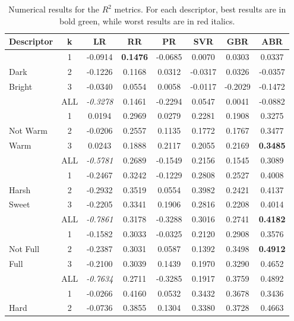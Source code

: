 \begin{table}[tbp] %
\caption{Numerical results for the $R^2$ metrics. For each descriptor, best results are in bold green, while worst results are in red italics.}
\label{tab:Violin:allR2}
\centering
\bgroup
\def\arraystretch{1.5}
\begin{tabular}{||l|c|c|c|c|c|c|c||}
\hline
\hline
Descriptor & k & LR & RR & PR & SVR & GBR & ABR\\
\hline
\hline
 & 1 & -0.0914 & \color[HTML]{326B00}\textbf{0.1476} & -0.0685 & 0.0070 & 0.0303 & 0.0337 \\
Dark & 2 & -0.1226 & 0.1168 & 0.0312 & -0.0317 & 0.0326 & -0.0357 \\
Bright & 3 & -0.0340 & 0.0554 & 0.0058 & -0.0117 & -0.2029 & -0.1472 \\
 & ALL & \color[HTML]{8E0000}\textit{-0.3278} & 0.1461 & -0.2294 & 0.0547 & 0.0041 & -0.0882 \\
\hline
\hline
 & 1 & 0.0194 & 0.2969 & 0.0279 & 0.2281 & 0.1908 & 0.3275 \\
Not Warm & 2 & -0.0206 & 0.2557 & 0.1135 & 0.1772 & 0.1767 & 0.3477 \\
Warm & 3 & 0.0243 & 0.1888 & 0.2117 & 0.2055 & 0.2169 & \color[HTML]{326B00}\textbf{0.3485} \\
 & ALL & \color[HTML]{8E0000}\textit{-0.5781} & 0.2689 & -0.1549 & 0.2156 & 0.1545 & 0.3089 \\
\hline
\hline
 & 1 & -0.2467 & 0.3242 & -0.1229 & 0.2808 & 0.2527 & 0.4008 \\
Harsh & 2 & -0.2932 & 0.3519 & 0.0554 & 0.3982 & 0.2421 & 0.4137 \\
Sweet & 3 & -0.2205 & 0.3341 & 0.1906 & 0.2816 & 0.2208 & 0.4014 \\
 & ALL & \color[HTML]{8E0000}\textit{-0.7861} & 0.3178 & -0.3288 & 0.3016 & 0.2741 & \color[HTML]{326B00}\textbf{0.4182 }\\
\hline
\hline
 & 1 & -0.1582 & 0.3033 & -0.0325 & 0.2120 & 0.2908 & 0.3576 \\
Not Full & 2 & -0.2387 & 0.3031 & 0.0587 & 0.1392 & 0.3498 & \color[HTML]{326B00}\textbf{0.4912} \\
Full & 3 & -0.2100 & 0.3039 & 0.1439 & 0.1970 & 0.3290 & 0.4652 \\
 & ALL & \color[HTML]{8E0000}\textit{-0.7634} & 0.2711 & -0.3285 & 0.1917 & 0.3759 & 0.4892 \\
\hline
\hline
 & 1 & -0.0266 & 0.4160 & 0.0532 & 0.3432 & 0.3678 & 0.3436 \\
Hard & 2 & -0.0736 & 0.3855 & 0.1304 & 0.3380 & 0.3728 & 0.4663 \\

\end{tabular}
\end{table}
